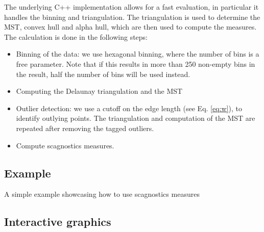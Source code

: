 The underlying C++ implementation allows for a fast evaluation, in
particular it handles the binning and triangulation. The triangulation
is used to determine the MST, convex hull and alpha hull, which are then
used to compute the measures. The calculation is done in the following
steps:

\begin{itemize}
\tightlist
\item
  Binning of the data: we use hexagonal binning, where the number of
  bins is a free parameter. Note that if this results in more than 250
  non-empty bins in the result, half the number of bins will be used
  instead.
\item
  Computing the Delaunay triangulation and the MST
\item
  Outlier detection: we use a cutoff on the edge length (see Eq.
  \ref{eq:w}), to identify outlying points. The triangulation and
  computation of the MST are repeated after removing the tagged
  outliers.
\item
  Compute scagnostics measures.
\end{itemize}

\hypertarget{example}{%
\subsection{Example}\label{example}}

A simple example showcasing how to use scagnostics measures

\begin{Schunk}
\end{Schunk}

\hypertarget{interactive-graphics}{%
\subsection{Interactive graphics}\label{interactive-graphics}}

